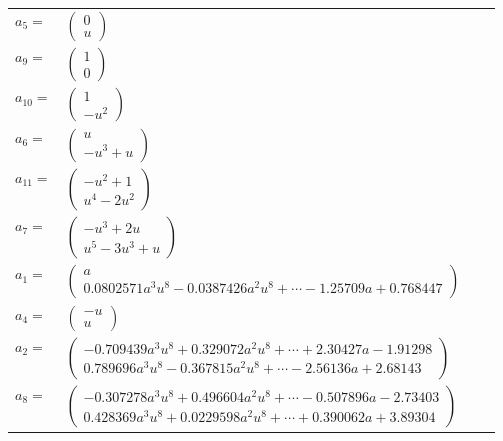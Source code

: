 \documentclass[1p]{elsarticle_modified}
\theoremstyle{definition}
\begin{document}
\begin{tabular}{m{7pt} m{180pt} m{7pt} m{180pt} }
\flushright $a_{5}=$&$\begin{pmatrix}0\\u\end{pmatrix}$ \\
\flushright $a_{9}=$&$\begin{pmatrix}1\\0\end{pmatrix}$ \\
\flushright $a_{10}=$&$\begin{pmatrix}1\\- u^2\end{pmatrix}$ \\
\flushright $a_{6}=$&$\begin{pmatrix}u\\- u^3+u\end{pmatrix}$ \\
\flushright $a_{11}=$&$\begin{pmatrix}- u^2+1\\u^4-2 u^2\end{pmatrix}$ \\
\flushright $a_{7}=$&$\begin{pmatrix}- u^3+2 u\\u^5-3 u^3+u\end{pmatrix}$ \\
\flushright $a_{1}=$&$\begin{pmatrix}a\\0.0802571 a^{3} u^{8}-0.0387426 a^{2} u^{8}+\cdots-1.25709 a+0.768447\end{pmatrix}$ \\
\flushright $a_{4}=$&$\begin{pmatrix}- u\\u\end{pmatrix}$ \\
\flushright $a_{2}=$&$\begin{pmatrix}-0.709439 a^{3} u^{8}+0.329072 a^{2} u^{8}+\cdots+2.30427 a-1.91298\\0.789696 a^{3} u^{8}-0.367815 a^{2} u^{8}+\cdots-2.56136 a+2.68143\end{pmatrix}$ \\
\flushright $a_{8}=$&$\begin{pmatrix}-0.307278 a^{3} u^{8}+0.496604 a^{2} u^{8}+\cdots-0.507896 a-2.73403\\0.428369 a^{3} u^{8}+0.0229598 a^{2} u^{8}+\cdots+0.390062 a+3.89304\end{pmatrix}$ \\

\end{tabular}
\end{document}
